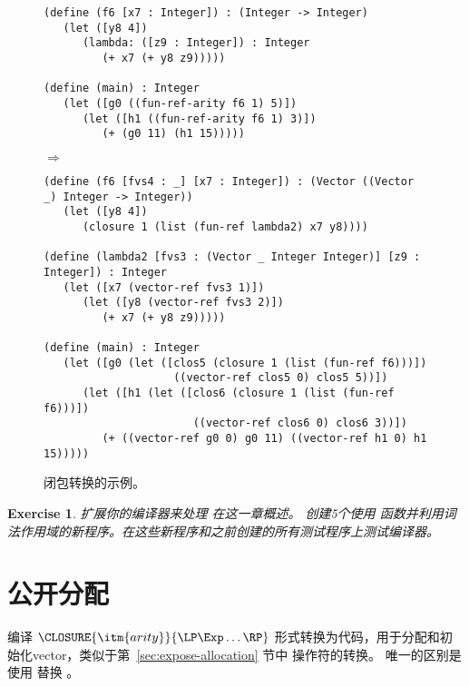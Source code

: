 \documentclass[11pt]{book}
\newtheorem{exercise}[theorem]{Exercise}
\begin{document}
\begin{figure}[tbp]
  \begin{minipage}{0.8\textwidth}
\begin{lstlisting}[basicstyle=\ttfamily\footnotesize]
(define (f6 [x7 : Integer]) : (Integer -> Integer)
   (let ([y8 4])
      (lambda: ([z9 : Integer]) : Integer
         (+ x7 (+ y8 z9)))))

(define (main) : Integer
   (let ([g0 ((fun-ref-arity f6 1) 5)])
      (let ([h1 ((fun-ref-arity f6 1) 3)])
         (+ (g0 11) (h1 15)))))
\end{lstlisting}
$\Rightarrow$
\begin{lstlisting}[basicstyle=\ttfamily\footnotesize]
(define (f6 [fvs4 : _] [x7 : Integer]) : (Vector ((Vector _) Integer -> Integer))
   (let ([y8 4])
      (closure 1 (list (fun-ref lambda2) x7 y8))))

(define (lambda2 [fvs3 : (Vector _ Integer Integer)] [z9 : Integer]) : Integer
   (let ([x7 (vector-ref fvs3 1)])
      (let ([y8 (vector-ref fvs3 2)])
         (+ x7 (+ y8 z9)))))

(define (main) : Integer
   (let ([g0 (let ([clos5 (closure 1 (list (fun-ref f6)))])
                    ((vector-ref clos5 0) clos5 5))])
      (let ([h1 (let ([clos6 (closure 1 (list (fun-ref f6)))])
                       ((vector-ref clos6 0) clos6 3))])
         (+ ((vector-ref g0 0) g0 11) ((vector-ref h1 0) h1 15)))))
\end{lstlisting}
\end{minipage}

\caption{闭包转换的示例。}
\label{fig:lexical-functions-example}
\end{figure}

\begin{exercise}\normalfont
扩展你的编译器来处理 \LangLam{} 在这一章概述。
创建5个使用  函数并利用词法作用域的新程序。在这些新程序和之前创建的所有测试程序上测试编译器。
\end{exercise}


\section{公开分配}
\label{sec:expose-allocation-r5}

编译 $\CLOSURE{\itm{arity}}{\LP\Exp\ldots\RP}$ 形式转换为代码，用于分配和初始化vector，类似于第~\ref{sec:expose-allocation} 节中  操作符的转换。
唯一的区别是使用  替换  。
\end{document}
